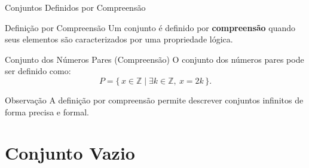 \documentclass[9pt]{beamer}
\begin{document}
\begin{frame}{Conjuntos Definidos por Compreensão}

\begin{block}{Definição por Compreensão}
Um conjunto é definido por \textbf{compreensão} quando seus elementos são caracterizados por uma propriedade lógica.
\end{block}

\begin{block}{Conjunto dos Números Pares (Compreensão)}
O conjunto dos números pares pode ser definido como:
\[
P = \{\, x \in \mathbb{Z} \mid \exists k \in \mathbb{Z},\ x = 2k \,\}.
\]
\end{block}

\begin{block}{Observação}
A definição por compreensão permite descrever conjuntos infinitos de forma precisa e formal.
\end{block}

\end{frame}
\section{Conjunto Vazio}
\end{document}
